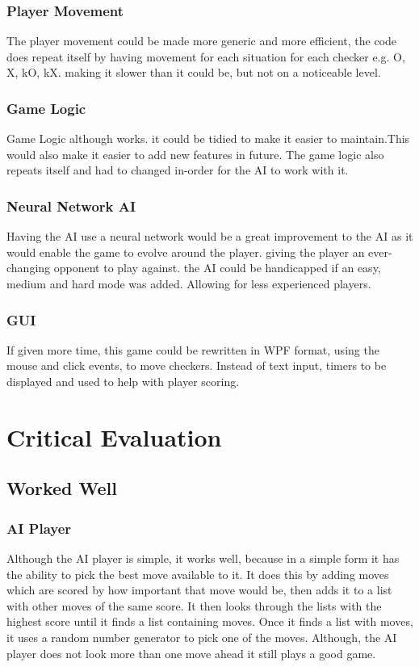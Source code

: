 \documentclass[10pt, a4paper]{article}
\begin{document}
	\subsubsection{Player Movement}
	The player movement could be made more generic and more efficient, the code does repeat itself by having movement for each situation for each checker e.g. O, X, kO, kX. making it slower than it could be, but not on a noticeable level.
	\subsubsection{Game Logic}
	Game Logic although works. it could be tidied to make it easier to maintain.This would also make it easier to add new features in future. The game logic also repeats itself and had to changed in-order for the AI to work with it.
	\subsubsection{Neural Network AI}
	Having the AI use a neural network would be a great improvement to the AI as it would enable the game to evolve around the player. giving the player an ever-changing opponent to play against. the AI could be handicapped if an easy, medium and hard mode was added. Allowing for less experienced players.
	\subsubsection{GUI}
	If given more time, this game could be rewritten in WPF format, using the mouse and click events, to move checkers. Instead of text input, timers to be displayed and used to help with player scoring.

	\section{Critical Evaluation}	
	\subsection{Worked Well}
	\subsubsection{AI Player}
	Although the AI player is simple, it works well, because in a simple form it has the ability to pick the best move available to it. It does this by adding moves which are scored by how important that move would be, then adds it to a list with other moves of the same score. It then looks through the lists with the highest score until it finds a list containing moves. Once it finds a list with moves, it uses a random number generator to pick one of the moves. Although, the AI player does not look more than one move ahead it still plays a good game.
\end{document}
